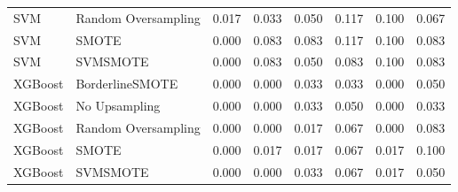 \begin{tabular}{llllllll}
                         SVM & Random Oversampling & 0.017 &                     0.033 &                 0.050 &                  0.117 &                                   0.100 &     0.067 \\
                         SVM &               SMOTE & 0.000 &                     0.083 &                 0.083 &                  0.117 &                                   0.100 &     0.083 \\
                         SVM &            SVMSMOTE & 0.000 &                     0.083 &                 0.050 &                  0.083 &                                   0.100 &     0.083 \\
                     XGBoost &     BorderlineSMOTE & 0.000 &                     0.000 &                 0.033 &                  0.033 &                                   0.000 &     0.050 \\
                     XGBoost &       No Upsampling & 0.000 &                     0.000 &                 0.033 &                  0.050 &                                   0.000 &     0.033 \\
                     XGBoost & Random Oversampling & 0.000 &                     0.000 &                 0.017 &                  0.067 &                                   0.000 &     0.083 \\
                     XGBoost &               SMOTE & 0.000 &                     0.017 &                 0.017 &                  0.067 &                                   0.017 &     0.100 \\
                     XGBoost &            SVMSMOTE & 0.000 &                     0.000 &                 0.033 &                  0.067 &                                   0.017 &     0.050 \\
\bottomrule
\end{tabular}
